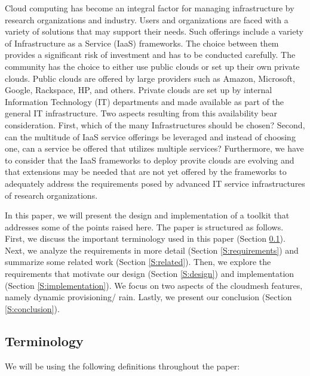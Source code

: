 \documentclass{tex/sig-alternate-2013}
\begin{document}
Cloud computing has become an integral factor for managing
infrastructure by research organizations and industry. Users and
organizations are faced with a variety of solutions that may support
their needs. Such offerings include a variety of Infrastructure as a
Service (IaaS) frameworks. The choice between them provides a
significant risk of investment and has to be conducted carefully. The
community has the choice to either use public clouds or set up their
own private clouds. Public clouds are offered by large providers such
as Amazon, Microsoft, Google, Rackspace, HP, and others. Private
clouds are set up by internal Information Technology (IT) departments
and made available as part of the general IT infrastructure. Two
aspects resulting from this availability bear consideration. First,
which of the many Infrastructures should be chosen? Second, can the
multitude of IaaS service offerings be leveraged and instead of
choosing one, can a service be offered that utilizes multiple
services? Furthermore, we have to consider that the IaaS frameworks to
deploy provite clouds are evolving and that extensions may be needed
that are not yet offered by the frameworks to adequately address the
requirements posed by advanced IT service infrastructures of research
organizations.

In this paper, we will present the design and implementation of a
toolkit that addresses some of the points raised here.  The paper is
structured as follows. First, we discuss the important terminology
used in this paper (Section \ref{S:terminology}).  Next, we analyze
the requirements in more detail (Section \ref{S:requirements}) and
summarize some related work (Section \ref{S:related}).  Then, we
explore the requirements that motivate our design (Section
\ref{S:design}) and implementation (Section \ref{S:implementation}).
We focus on two aspects of the cloudmesh features, namely dynamic
provisioning/ rain. Lastly, we present our conclusion (Section
\ref{S:conclusion}).



\subsection{Terminology} \label{S:terminology}

We will be using the following definitions throughout the paper:
\end{document}
